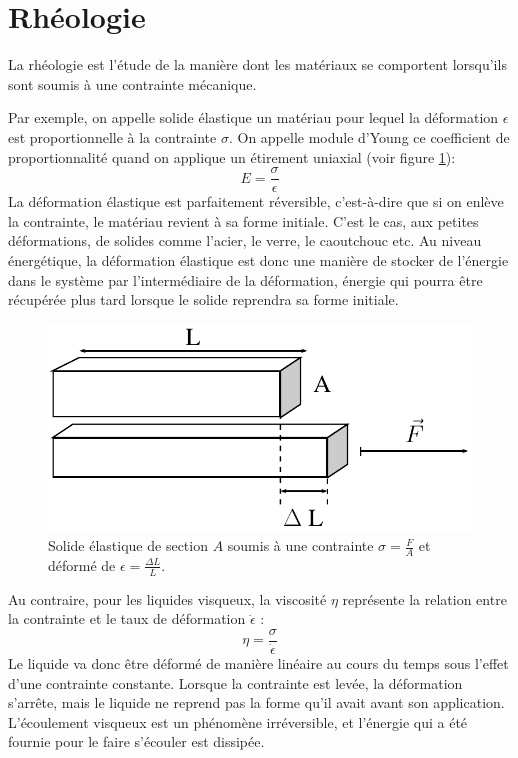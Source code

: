 \section{Rhéologie}

La rhéologie est l'étude de la manière dont les matériaux se comportent lorsqu'ils sont soumis à une contrainte mécanique.

Par exemple, on appelle solide élastique un matériau pour lequel la déformation $\epsilon$ est proportionnelle à la contrainte $ \sigma$. On appelle module d'Young ce coefficient de proportionnalité quand on applique un étirement uniaxial (voir figure \ref{young}): 
$$ E = \frac{\sigma}{\epsilon}$$
La déformation élastique est parfaitement réversible, c'est-à-dire que si on enlève la contrainte, le matériau revient à sa forme initiale. C'est le cas, aux petites déformations, de solides comme l'acier, le verre, le caoutchouc etc. Au niveau énergétique, la déformation élastique est donc une manière de stocker de l'énergie dans le système par l'intermédiaire de la déformation, énergie qui pourra être récupérée plus tard lorsque le solide reprendra sa forme initiale. 

\begin{figure}
\includegraphics[scale=0.5]{Figures/Young_modulus.pdf} 
\caption{Solide élastique de section $A$ soumis à une contrainte $\sigma=\frac{F}{A}$ et déformé de $\epsilon=\frac{\Delta L}{L}$. \label{young} }
\end{figure}

Au contraire, pour les liquides visqueux, la viscosité $\eta$ représente la relation entre la contrainte et le taux de déformation $\dot{\epsilon}$ : 
$$ \eta=\frac{\sigma}{\dot{\epsilon}}$$
Le liquide va donc être déformé de manière linéaire au cours du temps sous l'effet d'une contrainte constante. Lorsque la contrainte est levée, la déformation s'arrête, mais le liquide ne reprend pas la forme qu'il avait avant son application. 
L'écoulement visqueux est un phénomène irréversible, et l'énergie qui a été fournie pour le faire s'écouler est dissipée. 

